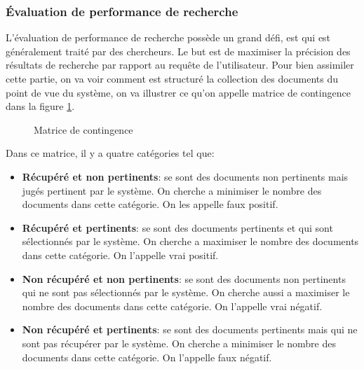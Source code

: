 \subsubsection{Évaluation de performance de recherche}
L'évaluation de performance de recherche possède un grand défi, est qui est généralement traité par des chercheurs. Le but est de maximiser la précision des résultats de recherche par rapport au requête de l'utilisateur. Pour bien assimiler cette partie, on va voir comment est structuré la collection des documents du point de vue du système, on va illustrer ce qu'on appelle matrice de contingence dans la figure \ref{matrice-contingence}.

\begin{figure}[htbp]
	\begin{center}
		\caption{Matrice de contingence \citep{vsm-for-arabic-language}}
	\end{center}
	\label{matrice-contingence}
\end{figure}

Dans ce matrice, il y a quatre catégories tel que:
\begin{itemize}
	\item \textbf{Récupéré et non pertinents}: se sont des documents non pertinents mais jugés pertinent par le système. On cherche a minimiser le nombre des documents dans cette catégorie. On les appelle faux positif.
	\item \textbf{Récupéré et pertinents}: se sont des documents pertinents et qui sont sélectionnés par le système. On cherche a maximiser le nombre des documents dans cette catégorie. On l'appelle vrai positif.
	\item \textbf{Non récupéré et non pertinents}: se sont des documents non pertinents qui ne sont pas sélectionnés par le système. On cherche aussi a maximiser le nombre des documents dans cette catégorie. On l'appelle vrai négatif.
	\item \textbf{Non récupéré et pertinents}: se sont des documents pertinents mais qui ne sont pas récupérer par le système. On cherche a minimiser le nombre des documents dans cette catégorie. On l'appelle faux négatif.
\end{itemize}

